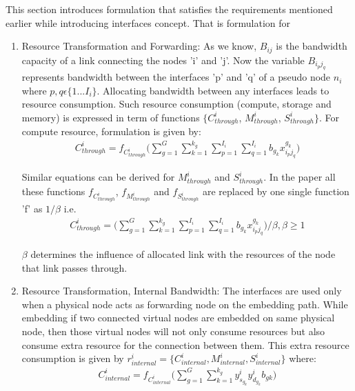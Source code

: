 \documentclass[article,dr=phil,type=msc ,colorback,accentcolor=tud4b]{tudthesis}
\begin{document}
\begin{enumerate}[label=(\Alph*)]
This section introduces formulation that satisfies the requirements mentioned earlier while introducing interfaces concept. That is formulation for 
\begin{enumerate}
\item Resource Transformation and Forwarding: As we know, $B_{ij}$ is the bandwidth capacity of a link connecting the nodes 'i' and 'j'. Now the variable  $B_{i_{p}j_{q}}$ represents bandwidth between the interfaces 'p' and 'q' of a pseudo node $n_{i}$ where $p,q \epsilon \{1...I_{i}\}$. Allocating bandwidth between any interfaces leads to resource consumption. Such resource consumption (compute, storage and memory) is expressed in term of functions $\{C_{through}^{i}$, $M_{through}^{i}$, $S_{through}^{i}\}$. For compute resource, formulation is given by:
\begin{equation}
\begin{split}
C^{i}_{through} =  f_{C^{i}_{through}} \big( \sum_{g=1}^{G} \sum_{k=1}^{k_{g}} \sum_{p=1}^{I_{i}} \sum_{q=1}^{I_{i}} b_{g_{k}}x_{i_{p}j_{q}}^{g_{k}}\big) 
\end{split}
\end{equation}

Similar equations can be derived for  $M_{through}^{i}$ and $S_{through}^{i}$. In the paper all these functions $f_{C^{i}_{through}}$, $f_{M^{i}_{through}}$ and $f_{S^{i}_{through}}$ are replaced by one single function 'f' as $1/\beta$ i.e.
\begin{equation} \label{c-i-through}
\begin{split}
C^{i}_{through} = \big( \sum_{g=1}^{G} \sum_{k=1}^{k_{g}} \sum_{p=1}^{I_{i}} \sum_{q=1}^{I_{i}} b_{g_{k}}x_{i_{p}j_{q}}^{g_{k}}\big)/\beta, \beta \geq 1
\end{split}
\end{equation}

$\beta$ determines the influence of allocated link with the resources of the node that link passes through. 
\item Resource Transformation, Internal Bandwidth: The interfaces are used only when a physical node acts as forwarding node on the embedding path. While embedding if two connected virtual nodes are embedded on same physical node, then those virtual nodes will not only consume resources but also consume extra resource for the connection between them. This extra resource consumption is given by $r^{i}_{internal} = \{C^{i}_{internal}, M^{i}_{internal} , S^{i}_{internal} \}$ where:
\begin{equation} \label{ci-intern1}
\begin{split}
C^{i}_{internal} = f_{C^{i}_{internal}} \big( \sum_{g=1}^{G} \sum_{k=1}^{k_{g}} y^{i}_{s_{g_{k}}} y^{i}_{d_{g_{k}}} b_{gk}\big)
\end{split}
\end{equation}


\end{enumerate}
\end{enumerate}
\end{document}

